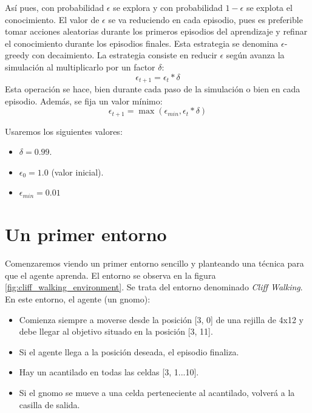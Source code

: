 \documentclass{article}
\begin{document}
Así pues, con probabilidad $\epsilon$ se explora y con probabilidad $1-\epsilon$ se explota el conocimiento. El valor de $\epsilon$ se va reduciendo en cada episodio, pues es preferible tomar acciones aleatorias durante los primeros episodios del aprendizaje y refinar el conocimiento durante los episodios finales. Esta estrategia se denomina $\epsilon$-greedy con decaimiento. La estrategia consiste en reducir $\epsilon$ según avanza la simulación al multiplicarlo por un factor $\delta$:
\begin{equation}
    \epsilon_{t+1}= \epsilon_{t}*\delta
\end{equation}
Esta operación se hace, bien durante cada paso de la simulación o bien en cada episodio. Además, se fija un valor mínimo:
\begin{equation}
    \epsilon_{t+1}= \max(\epsilon_{min}, \epsilon_{t}*\delta)
\end{equation}

Usaremos los siguientes valores:
\begin{itemize}
    \item $\delta=0.99$.
    \item $\epsilon_{0}=1.0$ (valor inicial).
    \item $\epsilon_{min}=0.01$
\end{itemize}







\section{Un primer entorno}
Comenzaremos viendo un primer entorno sencillo y planteando una técnica para que el agente aprenda. El entorno se observa en la figura \ref{fig:cliff_walking_environment}. Se trata del entorno denominado \textit{Cliff Walking}. En este entorno, el agente (un gnomo):
\begin{itemize}
    \item Comienza siempre a moverse desde la posición [3, 0] de una rejilla de 4x12 y debe llegar al objetivo situado en la posición [3, 11].
    \item Si el agente llega a la posición deseada, el episodio finaliza.
    \item Hay un acantilado en todas las celdas [3, 1...10]. 
    \item Si el gnomo se mueve a una celda perteneciente al acantilado, volverá a la casilla de salida.
\end{itemize}
\end{document}
